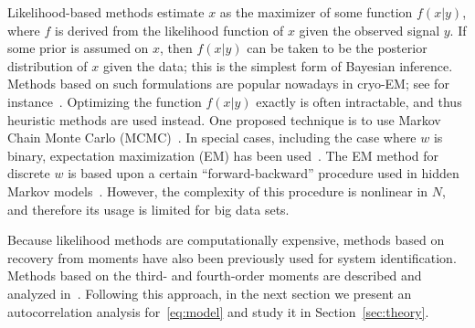 \documentclass[9pt,twocolumn,twoside,lineno]{pnas-new}
\begin{document}
Likelihood-based methods estimate $x$ as the maximizer of some function $f(x | y)$, where $f$ is derived from the likelihood function of $x$ given the observed signal $y$. %
If some prior is assumed on $x$, then $f(x|y)$ can be taken to be the posterior distribution of $x$ given the data; this is the simplest form of Bayesian inference.
Methods based on such formulations are popular nowadays in cryo-EM; see for instance~\cite{sigworth1998maximum,scheres2012relion}. 
Optimizing the function $f(x|y)$ exactly is often intractable, and thus heuristic methods are used instead. One proposed technique is to use Markov Chain Monte Carlo (MCMC)~\cite{cappe1999simulation}. %
In special cases, including the case where $w$ is binary, expectation maximization (EM) has been used~\cite{cappe1999simulation}. The EM method for discrete $w$ is based upon a certain ``forward-backward'' procedure used in hidden Markov models~\cite{rabiner1989tutorial}. However, the complexity of this procedure is nonlinear in $N$, and therefore its usage is limited for big data sets. 
%

Because likelihood methods are computationally expensive, methods based on recovery from moments have also been previously used for system identification. Methods based on the third- and fourth-order moments are described and analyzed in~\cite{lii1982deconvolution,giannakis1989identification,tugnait1984identification}. Following this approach, in the next section we present an autocorrelation analysis for~\eqref{eq:model} and study it in Section~\ref{sec:theory}.  
\end{document}
